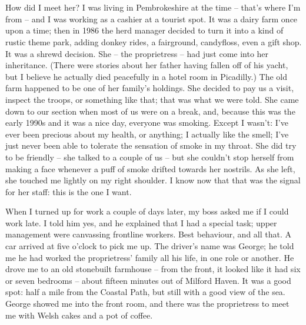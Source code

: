 \renewcommand{\thesection}{\Roman{section}} 


\section{}

How did I meet her? I was living in Pembrokeshire at the time -- that's where I'm from -- and I was working as a cashier at a tourist spot. It was a dairy farm once upon a time; then in 1986 the herd manager decided to turn it into a kind of rustic theme park, adding donkey rides, a fairground, candyfloss, even a gift shop. It was a shrewd decision. She -- the proprietress -- had just come into her inheritance. (There were stories about her father having fallen off of his yacht, but I believe he actually died peacefully in a hotel room in Picadilly.) The old farm happened to be one of her family's holdings. She decided to pay us a visit, inspect the troops, or something like that; that was what we were told. She came down to our section when most of us were on a break, and, because this was the early 1990s and it was a nice day, everyone was smoking. Except I wasn't: I've ever been precious about my health, or anything; I actually like the smell; I've just never been able to tolerate the sensation of smoke in my throat. She did try to be friendly -- she talked to a couple of us -- but she couldn't stop herself from making a face whenever a puff of smoke drifted towards her nostrils. As she left, she touched me lightly on my right shoulder. I know now that that was the signal for her staff: this is the one I want.

When I turned up for work a couple of days later, my boss asked me if I could work late. I told him yes, and he explained that I had a special task; upper management were canvassing frontline workers. Best behaviour, and all that. A car arrived at five o'clock to pick me up. The driver's name was George; he told me he had worked the proprietress' family all his life, in one role or another. He drove me to an old stonebuilt farmhouse -- from the front, it looked like it had six or seven bedrooms -- about fifteen minutes out of Milford Haven. It was a good spot: half a mile from the Coastal Path, but still with a good view of the sea. George showed me into the front room, and there was the proprietress to meet me with Welsh cakes and a pot of coffee.

